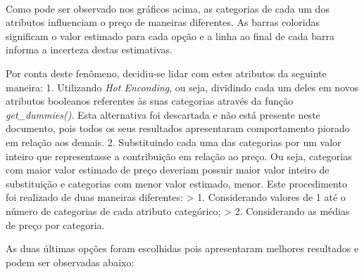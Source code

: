 \documentclass[11pt]{article}
\begin{document}
    \begin{center}
    \end{center}
    { \hspace*{\fill} \\}
    
    Como pode ser observado nos gráficos acima, as categorias de cada um dos
atributos influenciam o preço de maneiras diferentes. As barras
coloridas significam o valor estimado para cada opção e a linha ao final
de cada barra informa a incerteza destas estimativas.

    Por conta deste fenômeno, decidiu-se lidar com estes atributos da
seguinte maneira: 1. Utilizando \emph{Hot Enconding}, ou seja, dividindo
cada um deles em novos atributos booleanos referentes às suas categorias
através da função \emph{get\_dummies()}. Esta alternativa foi descartada
e não está presente neste documento, pois todos os seus resultados
apresentaram comportamento piorado em relação aos demais. 2.
Substituindo cada uma das categorias por um valor inteiro que
representasse a contribuição em relação ao preço. Ou seja, categorias
com maior valor estimado de preço deveriam possuir maior valor inteiro
de substituição e categorias com menor valor estimado, menor. Este
procedimento foi realizado de duas maneiras diferentes: \textgreater{}
1. Considerando valores de 1 até o número de categorias de cada atributo
categórico; \textgreater{} 2. Considerando as médias de preço por
categoria.

As duas últimas opções foram escolhidas pois apresentaram melhores
resultados e podem ser observadas abaixo:
\end{document}
